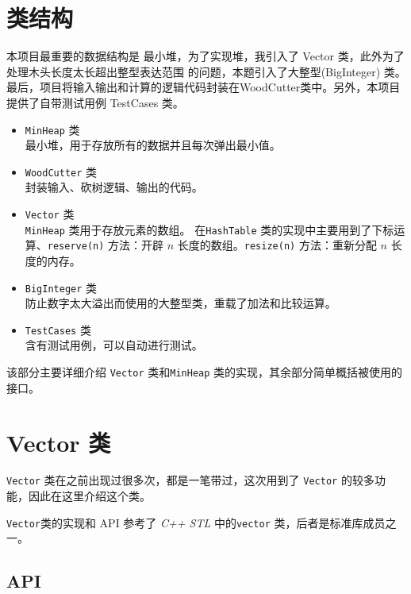 
\chapter{类结构}

本项目最重要的数据结构是 {\kaishu 最小堆}，为了实现堆，我引入了 Vector 类，此外为了处理木头长度太长超出整型表达范围%
的问题，本题引入了大整型(BigInteger) 类。最后，项目将输入输出和计算的逻辑代码封装在WoodCutter类中。另外，本项目%
提供了自带测试用例 TestCases 类。

\begin{itemize}
    \item \lstinline{MinHeap} 类\\
    最小堆，用于存放所有的数据并且每次弹出最小值。
    \item \lstinline{WoodCutter} 类\\
    封装输入、砍树逻辑、输出的代码。
    \item \lstinline{Vector} 类\\
    \lstinline{MinHeap} 类用于存放元素的数组。
    在\lstinline{HashTable} 类的实现中主要用到了下标运算、\lstinline{reserve(n)} 方法：开辟 $n$ 长度的数组。\lstinline{resize(n)}%
    方法：重新分配 $n$ 长度的内存。
    \item \lstinline{BigInteger} 类\\
    防止数字太大溢出而使用的大整型类，重载了加法和比较运算。
    \item \lstinline{TestCases} 类\\
    含有测试用例，可以自动进行测试。
\end{itemize}

该部分主要详细介绍 \lstinline{Vector} 类和\lstinline{MinHeap} 类的实现，其余部分简单概括被使用的接口。


\chapter{Vector 类}

\lstinline{Vector} 类在之前出现过很多次，都是一笔带过，这次用到了 \lstinline{Vector} 的较多功能，因此在这里介绍这个类。

\lstinline{Vector}类的实现和 API 参考了 \emph{C++ STL} 中的\lstinline{vector} 类，后者是标准库成员之一。

\section{API}

